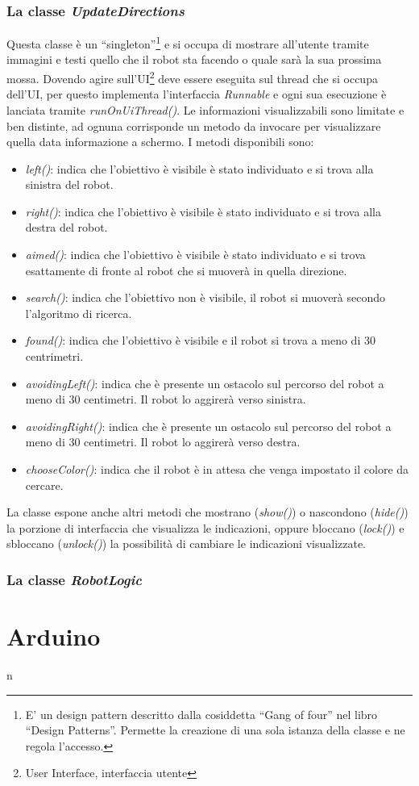  \subsubsection{La classe \emph{UpdateDirections}}
 Questa classe è un ``singleton''\footnote{E' un design pattern descritto dalla 
 cosiddetta ``Gang of four'' nel libro ``Design Patterns''. 
 Permette la creazione di una sola istanza della classe e ne regola l'accesso. } 
 e si occupa di mostrare all'utente tramite  immagini e testi quello che  il 
 robot sta facendo o quale sarà la sua prossima  mossa. Dovendo agire 
 sull'UI\footnote{User Interface, interfaccia utente} deve essere eseguita sul thread
 che si occupa dell'UI, per questo implementa l'interfaccia \emph{Runnable} e 
 ogni sua esecuzione è lanciata  tramite \emph{runOnUiThread()}. 
 Le informazioni visualizzabili sono limitate e ben distinte,
 ad ognuna corrisponde un metodo da invocare per visualizzare quella data informazione
 a schermo. I metodi disponibili sono: 
 \begin{itemize}
 \item \emph{left()}: indica che l'obiettivo è visibile è stato individuato e si trova alla sinistra del robot.
 \item \emph{right()}: indica che l'obiettivo è visibile è stato individuato e si trova alla destra del robot.
 \item \emph{aimed()}: indica che l'obiettivo è visibile è stato individuato e si trova esattamente di fronte al robot che si muoverà in quella direzione.
 \item \emph{search()}: indica che l'obiettivo non è visibile, il robot si muoverà secondo l'algoritmo di ricerca.
 \item \emph{found()}: indica che l'obiettivo è visibile e il robot si trova a meno di 30 centrimetri.
 \item \emph{avoidingLeft()}: indica che è presente un ostacolo sul percorso del robot a meno di 30 centimetri. Il robot lo aggirerà verso sinistra. 
 \item \emph{avoidingRight()}: indica che è presente un ostacolo sul percorso del robot a meno di 30 centimetri. Il robot lo aggirerà verso destra.
 \item \emph{chooseColor()}: indica che il robot è in attesa che venga impostato il colore da cercare. 
 \end{itemize}
 La classe espone anche altri metodi che mostrano (\emph{show()}) o nascondono 
 (\emph{hide()}) la porzione di interfaccia che visualizza le indicazioni, oppure bloccano (\emph{lock()})
 e sbloccano (\emph{unlock()}) la possibilità di cambiare le indicazioni visualizzate.

\subsubsection{La classe \emph{RobotLogic}}
\section {Arduino} n